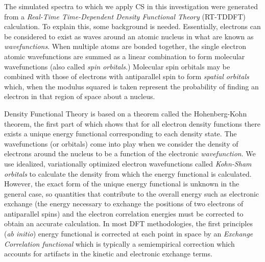 \documentclass[11pt]{article}
\begin{document}
\par The simulated spectra to which we apply CS in this investigation were generated from a \emph{Real-Time Time-Dependent Density Functional Theory} (RT-TDDFT) calculation. To explain this, some background is needed. Essentially, electrons can be considered to exist as waves around an atomic nucleus in what are known as \emph{wavefunctions}.  When multiple atoms are bonded together, the single electron atomic wavefunctions are summed as a linear combination to form molecular wavefunctions (also called \emph{spin orbitals}.) Molecular spin orbitals may be combined with those of electrons with antiparallel spin to form \emph{spatial orbitals} which, when the modulus squared is taken represent the probability of finding an electron in that region of space about a nucleus.\\

\par Density Functional Theory is based on a theorem called the Hohenberg-Kohn theorem, the first part of which shows that for all electron density functions there exists a unique energy functional corresponding to each density state.  The wavefunctions (or orbitals) come into play when we consider the density of electrons around the nucleus to be a function of the electronic \emph{wavefunction}.  We use idealized, variationally optimized electron wavefunctions called \emph{Kohn-Sham orbitals} to calculate the density from which the energy functional is calculated. However, the exact form of the unique energy functional is unknown in the general case, so quantities that contribute to the overall energy such as electronic exchange (the energy necessary to exchange the positions of two electrons of antiparallel spins) and the electron correlation energies must be corrected to obtain an accurate calculation.  In most DFT methodologies, the first principles (\emph{ab initio}) energy functional is corrected at each point in space by an \emph{Exchange Correlation functional} which is typically a semiempirical correction which accounts for artifacts in the kinetic and electronic exchange terms.\\
\end{document}
